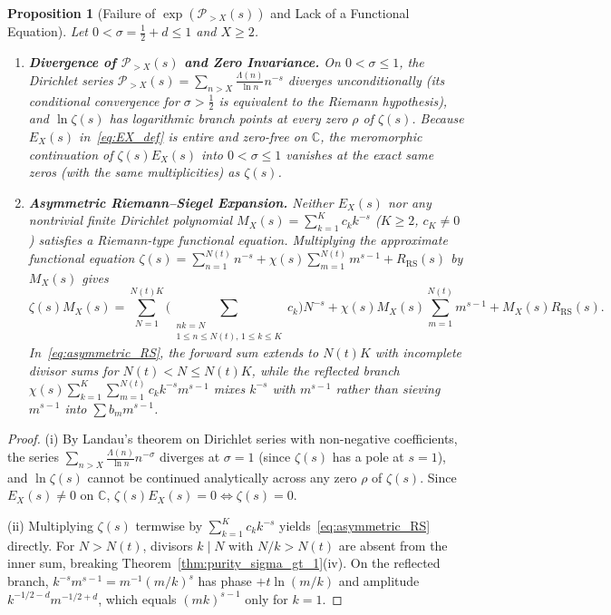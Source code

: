 \documentclass[11pt,reqno]{amsart}
\newtheorem{proposition}[theorem]{Proposition}
\theoremstyle{definition}
\theoremstyle{remark}
\numberwithin{equation}{section}
\newcommand{\C}{\mathbb{C}}
\begin{document}
\begin{proposition}[Failure of $\exp(\mathcal{P}_{>X}(s))$ and Lack of a Functional Equation]\label{prop:no_fe_obstruction}
Let $0 < \sigma = \frac{1}{2} + d \le 1$ and $X \ge 2$.
\begin{enumerate}[label=\textup{(\roman*)},leftmargin=2.2em]
\item \textbf{Divergence of $\mathcal{P}_{>X}(s)$ and Zero Invariance.} On $0 < \sigma \le 1$, the Dirichlet series $\mathcal{P}_{>X}(s) = \sum_{n > X} \frac{\Lambda(n)}{\ln n}n^{-s}$ diverges unconditionally (its conditional convergence for $\sigma > \frac{1}{2}$ is equivalent to the Riemann hypothesis), and $\ln\zeta(s)$ has logarithmic branch points at every zero $\rho$ of $\zeta(s)$. Because $E_X(s)$ in~\eqref{eq:EX_def} is entire and zero-free on $\C$, the meromorphic continuation of $\zeta(s)E_X(s)$ into $0 < \sigma \le 1$ vanishes at the exact same zeros (with the same multiplicities) as $\zeta(s)$.
\item \textbf{Asymmetric Riemann--Siegel Expansion.} Neither $E_X(s)$ nor any nontrivial finite Dirichlet polynomial $M_X(s) = \sum_{k=1}^K c_k k^{-s}$ ($K \ge 2$, $c_K \ne 0$) satisfies a Riemann-type functional equation. Multiplying the approximate functional equation $\zeta(s) = \sum_{n=1}^{N(t)} n^{-s} + \chi(s)\sum_{m=1}^{N(t)} m^{s-1} + R_{\mathrm{RS}}(s)$ by $M_X(s)$ gives
\begin{equation}\label{eq:asymmetric_RS}
\zeta(s)M_X(s) = \sum_{N=1}^{N(t)K} \Biggl(\sum_{\substack{nk = N \\ 1 \le n \le N(t),\, 1 \le k \le K}} c_k\Biggr)N^{-s} + \chi(s)M_X(s)\sum_{m=1}^{N(t)} m^{s-1} + M_X(s)R_{\mathrm{RS}}(s).
\end{equation}
In~\eqref{eq:asymmetric_RS}, the forward sum extends to $N(t)K$ with incomplete divisor sums for $N(t) < N \le N(t)K$, while the reflected branch $\chi(s)\sum_{k=1}^K \sum_{m=1}^{N(t)} c_k k^{-s}m^{s-1}$ mixes $k^{-s}$ with $m^{s-1}$ rather than sieving $m^{s-1}$ into $\sum b_m m^{s-1}$.
\end{enumerate}
\end{proposition}

\begin{proof}
(i) By Landau's theorem on Dirichlet series with non-negative coefficients, the series $\sum_{n > X} \frac{\Lambda(n)}{\ln n}n^{-\sigma}$ diverges at $\sigma = 1$ (since $\zeta(s)$ has a pole at $s = 1$), and $\ln\zeta(s)$ cannot be continued analytically across any zero $\rho$ of $\zeta(s)$. Since $E_X(s) \ne 0$ on $\C$, $\zeta(s)E_X(s) = 0 \iff \zeta(s) = 0$.

(ii) Multiplying $\zeta(s)$ termwise by $\sum_{k=1}^K c_k k^{-s}$ yields~\eqref{eq:asymmetric_RS} directly. For $N > N(t)$, divisors $k \mid N$ with $N/k > N(t)$ are absent from the inner sum, breaking Theorem~\ref{thm:purity_sigma_gt_1}(iv). On the reflected branch, $k^{-s}m^{s-1} = m^{-1}(m/k)^s$ has phase $+t\ln(m/k)$ and amplitude $k^{-1/2-d}m^{-1/2+d}$, which equals $(mk)^{s-1}$ only for $k = 1$.
\end{proof}
\end{document}
